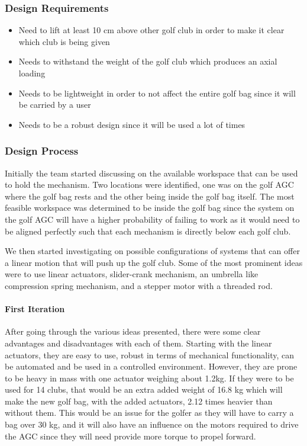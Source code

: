 \documentclass[11pt,landscape]{article}
\begin{document}
\begin{multicols}{3}
\subsubsection{Design Requirements}
\begin{itemize}
    \item Need to lift at least 10 cm above other golf club in order to make it
    clear which club is being given
    \item Needs to withstand the weight of the golf club which produces an axial loading
    \item Needs to be lightweight in order to not affect the entire golf bag
    since it will be carried by a user
    \item Needs to be a robust design since it will be used a lot of times
\end{itemize}

\subsubsection{Design Process}
Initially the team started discussing on the available workspace that can be
used to hold the mechanism. Two locations were identified, one was on the golf
AGC where the golf bag rests and the other being inside the golf bag itself.
The most feasible workspace was determined to be inside the golf bag since the
system on the golf AGC will have a higher probability of failing to work as it
would need to be aligned perfectly such that each mechanism is directly below
each golf club.

We then started investigating on possible configurations of systems that can
offer a linear motion that will push up the golf club. Some of the most
prominent ideas were to use linear actuators, slider-crank mechanism, an
umbrella like compression spring mechanism, and a stepper motor with a threaded
rod.

\paragraph{First Iteration}
After going through the various ideas presented, there were some clear
advantages and disadvantages with each of them. Starting with the linear
actuators, they are easy to use, robust in terms of mechanical functionality,
can be automated and be used in a controlled environment. However, they are
prone to be heavy in mass with one actuator weighing about 1.2kg.  If they were
to be used for 14 clubs, that would be an extra added weight of 16.8 kg which
will make the new golf bag, with the added actuators, 2.12 times heavier than
without them. This would be an issue for the golfer as they will have to carry a
bag over 30 kg, and it will also have an influence on the motors required to
drive the AGC since they will need provide more torque to propel forward.


\end{multicols}
\end{document}
